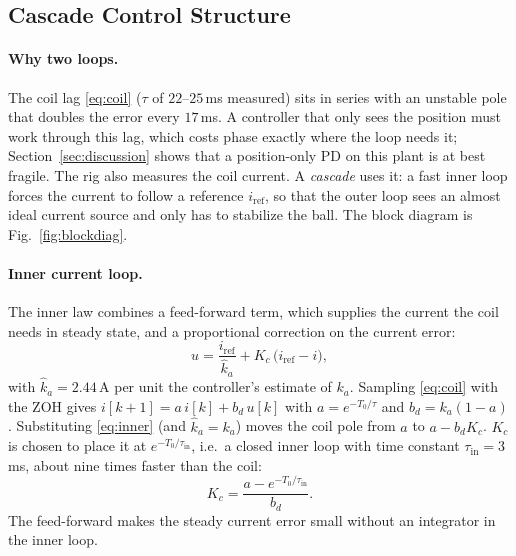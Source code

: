 \documentclass[11pt,a4paper]{article}
\begin{document}
\subsection{Cascade Control Structure}
\label{sec:th-cascade}
\paragraph{Why two loops.} The coil lag \eqref{eq:coil} ($\tau$ of $22$--$25$\,ms measured) sits in series with an
unstable pole that doubles the error every $17$\,ms. A controller that only sees the position must work through
this lag, which costs phase exactly where the loop needs it; Section~\ref{sec:discussion} shows that a
position-only PD on this plant is at best fragile. The rig also measures the coil current. A \emph{cascade} uses it: a
fast inner loop forces the current to follow a reference $i_{\mathrm{ref}}$, so that the outer loop sees an almost ideal
current source and only has to stabilize the ball. The block diagram is Fig.~\ref{fig:blockdiag}.

\paragraph{Inner current loop.} The inner law combines a feed-forward term, which supplies the current the coil
needs in steady state, and a proportional correction on the current error:
\begin{equation}
u = \frac{i_{\mathrm{ref}}}{\hat k_a} + K_c\,\bigl(i_{\mathrm{ref}} - i\bigr),
\label{eq:inner}
\end{equation}
with $\hat k_a = 2.44$\,A per unit the controller's estimate of $k_a$. Sampling \eqref{eq:coil} with the ZOH gives
$i[k+1] = a\,i[k] + b_d\,u[k]$ with $a=e^{-T_0/\tau}$ and $b_d=k_a(1-a)$. Substituting \eqref{eq:inner} (and
$\hat k_a = k_a$) moves the coil pole from $a$ to $a-b_dK_c$. $K_c$ is chosen to place it at $e^{-T_0/\tau_{\mathrm{in}}}$,
i.e.\ a closed inner loop with time constant $\tau_{\mathrm{in}}=3$\,ms, about nine times faster than the coil:
\begin{equation}
K_c = \frac{a - e^{-T_0/\tau_{\mathrm{in}}}}{b_d}.
\label{eq:kc}
\end{equation}
The feed-forward makes the steady current error small without an integrator in the inner loop.
\end{document}
